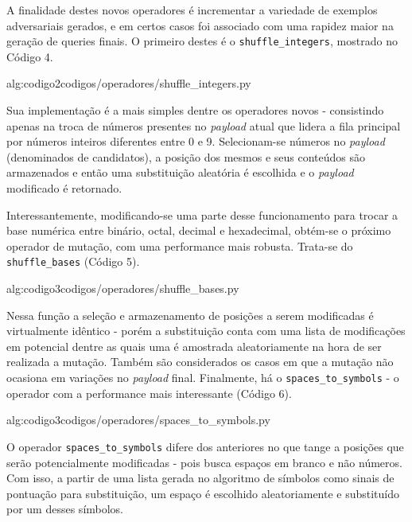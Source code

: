 A finalidade destes novos operadores é incrementar a variedade de exemplos adversariais gerados, e em certos casos foi associado com uma rapidez maior na geração de queries finais. O primeiro destes é o \verb+shuffle_integers+, mostrado no Código 4.

\label{sec:codigos}
 {alg:codigo2}{codigos/operadores/shuffle_integers.py}

\bigskip

Sua implementação é a mais simples dentre os operadores novos - consistindo apenas na troca de números presentes no \textit{payload} atual que lidera a fila principal por números inteiros diferentes entre 0 e 9. Selecionam-se números no \textit{payload} (denominados de candidatos), a posição dos mesmos e seus conteúdos são armazenados e então uma substituição aleatória é escolhida e o \textit{payload} modificado é retornado.  

Interessantemente, modificando-se uma parte desse funcionamento para trocar a base numérica entre binário, octal, decimal e hexadecimal, obtém-se o próximo operador de mutação, com uma performance mais robusta. Trata-se do \verb+shuffle_bases+ (Código 5).

\label{sec:codigos}
 {alg:codigo3}{codigos/operadores/shuffle_bases.py}

\bigskip

Nessa função a seleção e armazenamento de posições a serem modificadas é virtualmente idêntico - porém a substituição conta com uma lista de modificações em potencial dentre as quais uma é amostrada aleatoriamente na hora de ser realizada a mutação. Também são considerados os casos em que a mutação não ocasiona em variações no \textit{payload} final. Finalmente, há o \verb+spaces_to_symbols+ - o operador com a performance mais interessante (Código 6).

\label{sec:codigos}
 {alg:codigo3}{codigos/operadores/spaces_to_symbols.py}

\bigskip

O operador \verb+spaces_to_symbols+ difere dos anteriores no que tange a posições que serão potencialmente modificadas - pois busca espaços em branco e não números. Com isso, a partir de uma lista gerada no algoritmo de símbolos como sinais de pontuação para substituição, um espaço é escolhido aleatoriamente e substituído por um desses símbolos.

